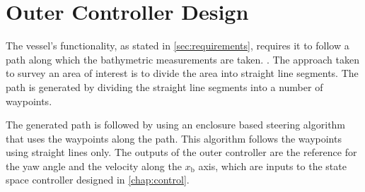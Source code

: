 \chapter{Outer Controller Design}\label{chap:outerController}
The vessel's functionality, as stated in \autoref{sec:requirements}, requires it to follow a path along which the bathymetric measurements are taken. . The approach taken to survey an area of interest is to divide the area into straight line segments. The path is generated by dividing the straight line segments into a number of waypoints.

The generated path is followed by using an enclosure based steering algorithm \cite[pp. 258-265]{TFossen} that uses the waypoints along the path. This algorithm follows the waypoints using straight lines only. The outputs of the outer controller are the reference for the yaw angle and the velocity along the $x_\mathrm{b}$ axis, which are inputs to the state space controller designed in \autoref{chap:control}. 